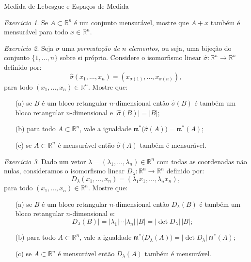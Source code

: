 \documentclass[oneside,final,11pt]{amsbook}
\newcommand{\R}{\mathds R}
\newcommand{\leb}{\mathfrak m}
\theoremstyle{remark}\newtheorem{exercise}{Exercício}[chapter]
\theoremstyle{remark}\newtheorem{*exercise}[exercise]{\hbox to 0pt{\hskip 0pt minus 1fil*}Exercício}
\theoremstyle{definition}\newtheorem{exdefin}{Definição}[chapter]
\theoremstyle{plain}\newtheorem{teo}{Teorema}[section]
\theoremstyle{plain}\newtheorem{lem}[teo]{Lema}
\theoremstyle{plain}\newtheorem{prop}[teo]{Proposição}
\theoremstyle{plain}\newtheorem{cor}[teo]{Corolário}
\theoremstyle{definition}\newtheorem{defin}[teo]{Definição}
\theoremstyle{remark}\newtheorem{rem}[teo]{Observação}
\theoremstyle{definition}\newtheorem{notation}[teo]{Notação}
\theoremstyle{definition}\newtheorem{convention}[teo]{Convenção}
\theoremstyle{definition}\newtheorem{example}[teo]{Exemplo}
\numberwithin{section}{chapter}
\numberwithin{equation}{section}
\begin{document}
\begin{chapter}{Medida de Lebesgue e Espaços de Medida}
\begin{exercise}\label{exe:translmens}
Se $A\subset\R^n$ é um conjunto mensurável, mostre que $A+x$ também é mensurável
para todo $x\in\R^n$.
\end{exercise}

\begin{exercise}\label{exe:permutacao}
Seja $\sigma$ uma {\em permutação de $n$ elementos},
ou seja, uma bijeção do conjunto $\{1,\ldots,n\}$ sobre si próprio.
Considere o isomorfismo linear $\widehat\sigma:\R^n\to\R^n$ definido por:\index[simbolos]{$\widehat\sigma$}
\[\widehat\sigma(x_1,\ldots,x_n)=(x_{\sigma(1)},\ldots,x_{\sigma(n)}),\]
para todo $(x_1,\ldots,x_n)\in\R^n$. Mostre que:
\begin{itemize}
\item[(a)] se $B$ é um bloco retangular $n$-dimensional então $\widehat\sigma(B)$ é também um bloco retangular $n$-dimensional
e $\vert\widehat\sigma(B)\vert=\vert B\vert$;
\item[(b)] para todo $A\subset\R^n$, vale a igualdade $\leb^*\big(\widehat\sigma(A)\big)=\leb^*(A)$;
\item[(c)] se $A\subset\R^n$ é mensurável então $\widehat\sigma(A)$ também é mensurável.
\end{itemize}
\end{exercise}

\begin{exercise}\label{exe:diagonal}
Dado um vetor $\lambda=(\lambda_1,\ldots,\lambda_n)\in\R^n$ com todas as coordenadas não nulas, consideramos
o isomorfismo linear $D_\lambda:\R^n\to\R^n$ definido por:
\[D_\lambda(x_1,\ldots,x_n)=(\lambda_1x_1,\ldots,\lambda_nx_n),\]
para todo $(x_1,\ldots,x_n)\in\R^n$. Mostre que:
\begin{itemize}
\item[(a)] se $B$ é um bloco retangular $n$-dimensional então $D_\lambda(B)$ é também um bloco retangular $n$-dimensional
e:
\[\vert D_\lambda(B)\vert=\vert\lambda_1\vert\cdots\vert\lambda_n\vert\,\vert B\vert=
\vert\det D_\lambda\vert\,\vert B\vert;\]
\item[(b)] para todo $A\subset\R^n$, vale a igualdade $\leb^*\big(D_\lambda(A)\big)=\vert\det D_\lambda\vert\,\leb^*(A)$;
\item[(c)] se $A\subset\R^n$ é mensurável então $D_\lambda(A)$ também é mensurável.
\end{itemize}
\end{exercise}


\end{chapter}
\end{document}
